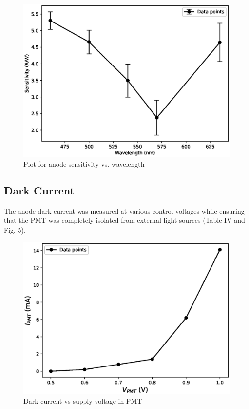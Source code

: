 


\begin{figure}[H]
    \centering
    \includegraphics[width=1\columnwidth]{images/spec.eps}
    \caption{Plot for anode sensitivity vs. wavelength}
    \label{g2}
\end{figure}

\subsection{Dark Current}
The anode dark current was measured at various
control voltages while ensuring that the PMT was
completely isolated from external light sources (Table IV and Fig. 5).


\begin{figure}
    \centering
    \includegraphics[width=1\columnwidth]{images/dark.eps}
    \caption{Dark current vs supply voltage in PMT}
    \label{g3}
\end{figure}

